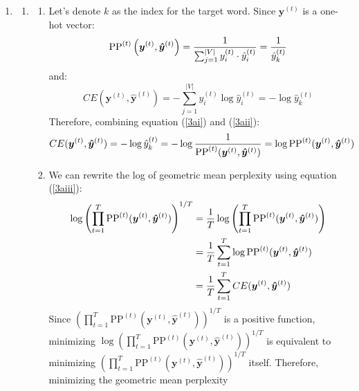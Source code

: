 \documentclass[10pt,reqno]{amsart}
\begin{document}
\begin{enumerate}[topsep=0pt,itemsep=3ex,partopsep=1ex,parsep=1ex]
\item
  \begin{enumerate}[itemsep=2ex]
  \item
    \begin{enumerate}[itemsep=2ex]
      \item Let's denote $k$ as the index for the target word. Since $\bm{y}^{(t)}$ is a 
        one-hot vector:
        \begin{equation}
          \text{PP}^{(t)}\left(\bm{y}^{(t)}, \bm{\hat{y}}^{(t)}\right) 
          = \frac{1}{\sum^{|V|}_{j=1} y^{(t)}_i \cdot \hat{y}^{(t)}_i}
          = \frac{1}{\hat{y}^{(t)}_k} \label{3ai}
        \end{equation}
        and:
        \begin{equation}
          CE(\bm{y}^{(t)}, \bm{\hat{y}}^{(t)})
          = - \sum^{|V|}_{j=1} y^{(t)}_i \log \hat{y}^{(t)}_i
          = - \log \hat{y}^{(t)}_k \label{3aii}
        \end{equation}
        Therefore, combining equation (\ref{3ai}) and (\ref{3aii}):
        \begin{equation}
          CE(\bm{y}^{(t)}, \bm{\hat{y}}^{(t)})
          = - \log \hat{y}^{(t)}_k
          = - \log \frac{1}{\text{PP}^{(t)}(\bm{y}^{(t)}, \bm{\hat{y}}^{(t)})}
          = \log \text{PP}^{(t)}(\bm{y}^{(t)}, \bm{\hat{y}}^{(t)}) \label{3aiii}
        \end{equation}
      \item
        We can rewrite the log of geometric mean perplexity using equation (\ref{3aiii}):
        \begin{align*}
          \log \left( \prod^T_{t=1} \text{PP}^{(t)}(\bm{y}^{(t)}, \bm{\hat{y}}^{(t)}) \right)^{1/T}
          &= \frac{1}{T} \log \left( \prod^T_{t=1} \text{PP}^{(t)}(\bm{y}^{(t)}, \bm{\hat{y}}^{(t)}) \right) \\
          &= \frac{1}{T} \sum^T_{t=1} \log \text{PP}^{(t)}(\bm{y}^{(t)}, \bm{\hat{y}}^{(t)}) \\
          &= \frac{1}{T} \sum^T_{t=1} CE(\bm{y}^{(t)}, \bm{\hat{y}}^{(t)})
        \end{align*}
        Since $\left( \prod^T_{t=1} \text{PP}^{(t)}(\bm{y}^{(t)}, \bm{\hat{y}}^{(t)}) \right)^{1/T}$ is 
        a positive function, minimizing 
        $\log \left( \prod^T_{t=1} \text{PP}^{(t)}(\bm{y}^{(t)}, \bm{\hat{y}}^{(t)}) \right)^{1/T}$
        is equivalent to minimizing 
        $\left( \prod^T_{t=1} \text{PP}^{(t)}(\bm{y}^{(t)}, \bm{\hat{y}}^{(t)}) \right)^{1/T}$ itself. 
        Therefore, minimizing the geometric mean perplexity 

\end{enumerate}
\end{enumerate}
\end{enumerate}
\end{document}
